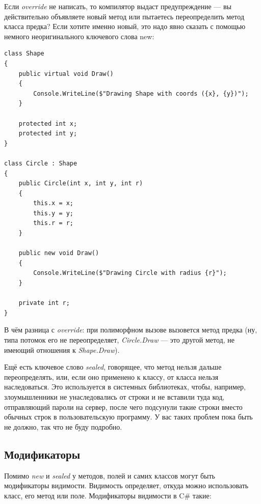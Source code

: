 \documentclass[a5paper]{article}
\begin{document}
Если \textit{override} не написать, то компилятор выдаст предупреждение --- вы действительно объявляете новый метод или пытаетесь переопределить метод класса предка? Если хотите именно новый, это надо явно сказать с помощью немного неоригинального ключевого слова new:

\begin{verbatim}
class Shape
{
    public virtual void Draw()
    {
        Console.WriteLine($"Drawing Shape with coords ({x}, {y})");
    }

    protected int x;
    protected int y;
}

class Circle : Shape
{
    public Circle(int x, int y, int r)
    {
        this.x = x;
        this.y = y;
        this.r = r;
    }

    public new void Draw()
    {
        Console.WriteLine($"Drawing Circle with radius {r}");
    }

    private int r;
}
\end{verbatim}

В чём разница с \textit{override}: при полиморфном вызове вызовется метод предка (ну, типа потомок его не переопределяет, \textit{Circle.Draw} --- это другой метод, не имеющий отношения к \textit{Shape.Draw}). 

Ещё есть ключевое слово \textit{sealed}, говорящее, что метод нельзя дальше переопределять, или, если оно применено к классу, от класса нельзя наследоваться. Это используется в системных библиотеках, чтобы, например, злоумышленники не унаследовались от строки и не вставили туда код, отправляющий пароли на сервер, после чего подсунули такие строки вместо обычных строк в пользовательскую программу. У вас таких проблем пока быть не должно, так что не буду подробно.

\subsection{Модификаторы}

Помимо \textit{new} и \textit{sealed} у методов, полей и самих классов могут быть модификаторы видимости. Видимость определяет, откуда можно использовать класс, его метод или поле. Модификаторы видимости в C\# такие:
\end{document}
